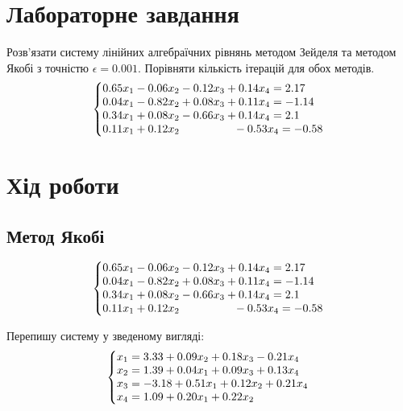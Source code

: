 \documentclass{article}
\begin{document}
\begin{large}
		\section*{Лабораторне завдання}
		Розв’язати систему лінійних алгебраїчних рівнянь методом Зейделя та
		методом Якобі з точністю $\epsilon=0.001$. Порівняти кількість ітерацій для обох
		методів.
		\begin{gather}\nonumber
			\left\{\begin{array}{@{}l@{}}
				0.65x_1-0.06x_2-0.12x_3+0.14x_4=2.17\\\nonumber
				0.04x_1-0.82x_2+0.08x_3+0.11x_4=-1.14\\\nonumber
				0.34x_1+0.08x_2-0.66x_3+0.14x_4=2.1\\\nonumber
				0.11x_1+0.12x_2\hspace{48pt}-0.53x_4=-0.58\nonumber
			\end{array}\right.\,
		\end{gather}
		\section*{Хід роботи}
		\subsection*{Метод Якобі}	
		\begin{gather}
			\left\{\begin{array}{@{}l@{}}
				0.65x_1-0.06x_2-0.12x_3+0.14x_4=2.17\\\nonumber
				0.04x_1-0.82x_2+0.08x_3+0.11x_4=-1.14\\\nonumber
				0.34x_1+0.08x_2-0.66x_3+0.14x_4=2.1\\\nonumber
				0.11x_1+0.12x_2\hspace{48pt}-0.53x_4=-0.58\nonumber
			\end{array}\right.\,
		\end{gather}
	
		Перепишу систему у зведеному вигляді:
		\begin{gather}
			\left\{\begin{array}{@{}l@{}}
				x_1=3.33+0.09x_2+0.18x_3-0.21x_4\\\nonumber
				x_2=1.39+0.04x_1+0.09x_3+0.13x_4\\\nonumber
				x_3=-3.18+0.51x_1+0.12x_2+0.21x_4\\\nonumber
				x_4=1.09+0.20x_1+0.22x_2\nonumber
			\end{array}\right.\,
		\end{gather}
	

\end{large}
\end{document}
